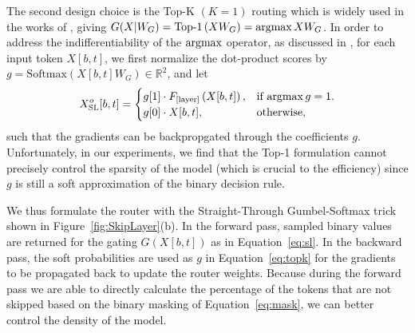\documentclass{article}
\begin{document}
The second design choice is the Top-K $(K=1)$ routing which is widely used in the works of \cite{du2022glam, lepikhin2020gshard}, giving $G(X|W_G)=\text{Top-1}\left(XW_G\right)=\mathop{\mathrm{argmax}}{XW_G}$. In order to address the indifferentiability of the $\mathop{\mathrm{argmax}}$ operator, as discussed in \cite{lepikhin2020gshard}, for each input token $X[b, t]$, we first normalize the dot-product scores by $g= \text{Softmax}(X[b, t]W_G)\in\mathbb{R}^2$, and let 
\begin{align}
    X^{o}_{\text{SL}}[b, t]=
    \begin{cases}
        g[1]\cdot F_{[\text{layer}]}\left(X[b, t]\right), & \text{if $\mathop{\mathrm{argmax}} g=1$}.\\
        g[0]\cdot X[b,t], & \text{otherwise},
    \end{cases}
    \label{eq:topk}
\end{align}
such that the gradients can be backpropgated through the coefficients $g$.
Unfortunately, in our experiments, we find that the Top-1 formulation cannot precisely control the sparsity of the model (which is crucial to the efficiency) since $g$ is still a soft approximation of the binary decision rule.

We thus formulate the router with the Straight-Through Gumbel-Softmax trick shown in Figure~\ref{fig:SkipLayer}(b). In the forward pass, sampled binary values are returned for the gating $G(X[b, t])$ as in Equation~\ref{eq:sl}. In the backward pass, the soft probabilities are used as $g$ in Equation~\ref{eq:topk} for the gradients to be propagated back to update the router weights. Because during the forward pass we are able to directly calculate the percentage of the tokens that are not skipped based on the binary masking of Equation~\ref{eq:mask}, we can better control the density of the model.


\end{document}
